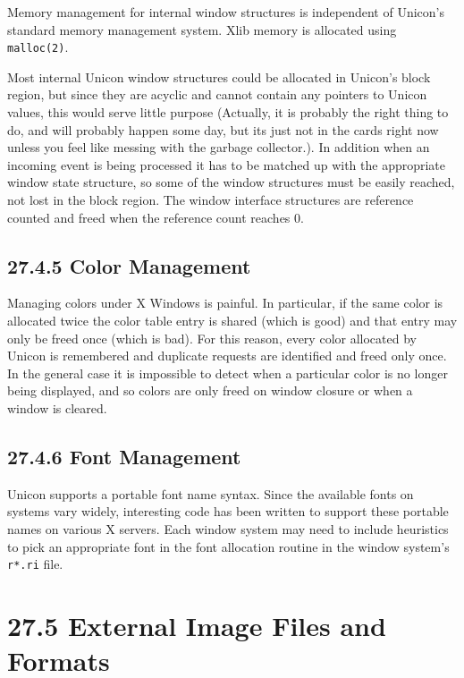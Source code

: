 Memory management for internal window structures is independent of
Unicon's standard memory management system. Xlib memory is allocated
using \texttt{malloc(2)}.

Most internal Unicon window structures could be allocated in Unicon's
block region, but since they are acyclic and cannot contain any
pointers to Unicon values, this would serve little purpose (Actually,
it is probably the right thing to do, and will probably happen some
day, but its just not in the cards right now unless you feel like
messing with the garbage collector.). In addition when an incoming
event is being processed it has to be matched up with the appropriate
window state structure, so some of the window structures must be
easily reached, not lost in the block region. The window interface
structures are reference counted and freed when the reference count
reaches 0.

\subsection[27.4.5 Color Management]{27.4.5 Color Management}

Managing colors under X Windows is painful. In particular, if the same
color is allocated twice the color table entry is shared (which is
good) and that entry may only be freed once (which is bad). For this
reason, every color allocated by Unicon is remembered and duplicate
requests are identified and freed only once. In the general case it is
impossible to detect when a particular color is no longer being
displayed, and so colors are only freed on window closure or when a
window is cleared.

\subsection[27.4.6 Font Management]{27.4.6 Font Management}

Unicon supports a portable font name syntax. Since the available fonts
on systems vary widely, {\textquotedbl}interesting{\textquotedbl} code
has been written to support these portable names on various X servers.
Each window system may need to include heuristics to pick an
appropriate font in the font allocation routine in the window system's
\texttt{r*.ri} file.

\section[27.5 External Image Files and Formats]{27.5 External Image Files and Formats}

